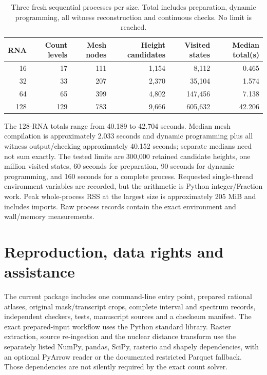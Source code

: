 \documentclass[10pt,letterpaper]{article}
\begin{document}
\begin{table}[ht]\centering
\begin{tabular}{rrrrrr}\toprule
RNA&Count levels&Mesh nodes&Height candidates&Visited states&Median total(s)\\\midrule
16&17&111&1,154&8,112&0.465\\
32&33&207&2,370&35,104&1.574\\
64&65&399&4,802&147,456&7.138\\
128&129&783&9,666&605,632&42.206\\\bottomrule
\end{tabular}
\caption{Three fresh sequential processes per size. Total includes preparation, dynamic programming, all witness reconstruction and continuous checks. No limit is reached.}
\end{table}

The 128-RNA totals range from 40.189 to 42.704 seconds. Median mesh compilation is approximately 2.033 seconds and dynamic programming plus all witness output/checking approximately 40.152 seconds; separate medians need not sum exactly. The tested limits are 300,000 retained candidate heights, one million visited states, 60 seconds for preparation, 90 seconds for dynamic programming, and 160 seconds for a complete process. Requested single-thread environment variables are recorded, but the arithmetic is Python integer/Fraction work. Peak whole-process RSS at the largest size is approximately 205 MiB and includes imports. Raw process records contain the exact environment and wall/memory measurements.

\section{Reproduction, data rights and assistance}
The current package includes one command-line entry point, prepared rational atlases, original mask/transcript crops, complete interval and spectrum records, independent checkers, tests, manuscript sources and a checksum manifest. The exact prepared-input workflow uses the Python standard library. Raster extraction, source re-ingestion and the nuclear distance transform use the separately listed NumPy, pandas, SciPy, rasterio and shapely dependencies, with an optional PyArrow reader or the documented restricted Parquet fallback. Those dependencies are not silently required by the exact count solver.
\end{document}
